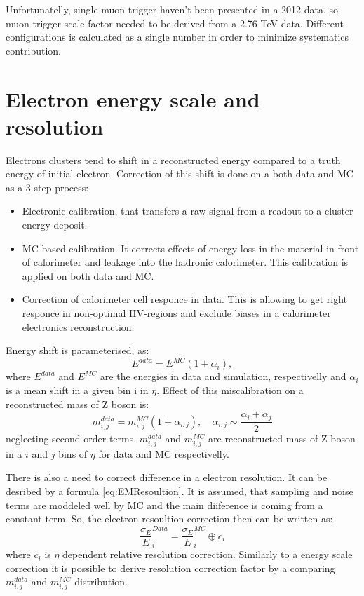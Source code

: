 Unfortunatelly, single muon trigger haven't been presented in a 2012 data, so muon trigger scale factor needed to be derived from a 2.76 TeV data. Different configurations is calculated as a single number in order to minimize systematics contribution. 
\section{Electron energy scale and resolution}
Electrons clusters tend to shift in a reconstructed energy compared to a truth energy of initial electron. Correction of this shift is done on a both data and MC as a 3 step process:
\begin{itemize}
\item Electronic calibration, that transfers a raw signal from a readout to a cluster energy deposit.
\item MC based calibration. It corrects effects of energy loss in the material in front of calorimeter and leakage into the hadronic calorimeter. This calibration is applied on both data and MC.
\item Correction of calorimeter cell responce in data. This is allowing to get right responce in non-optimal HV-regions and exclude biases in a calorimeter electronics reconstruction.
\end{itemize}

Energy shift is parameterised, as:
\begin{equation}
E^{data}=E^{MC}(1+\alpha_i),
\end{equation}
where $E^{data}$ and $E^{MC}$ are the energies in data and simulation, respectivelly and $\alpha_i$ is a mean shift in a given bin i in $\eta$. Effect of this miscalibration on a reconstructed mass of Z boson is:
\begin{equation}
m_{i,j}^{data}=m_{i,j}^{MC}(1+\alpha_{i,j}), \quad \alpha_{i,j} \sim \frac{\alpha_i+\alpha_j}{2}
\end{equation}
neglecting second order terms. $m_{i,j}^{data}$ and $m_{i,j}^{MC}$ are reconstructed mass of Z boson in a $i$ and $j$ bins of $\eta$ for data and MC respectivelly. 

There is also a need to correct difference in a electron resolution. It can be desribed by a formula \ref{eq:EMResoultion}. It is assumed, that sampling and noise terms are moddeled well by MC and the main diiference is coming from a constant term. 
So, the electron resoultion correction then can be written as:
\begin{equation}
\frac{\sigma_E}{E}^{Data}_{i}=\frac{\sigma_E}{E}^{MC}_{i} \oplus c_i
\end{equation}
where $c_i$ is $\eta$ dependent relative resolution correction. Similarly to a energy scale correction it is possible to derive resolution correction factor by a comparing $m_{i,j}^{data}$ and $m_{i,j}^{MC}$ distribution. 

